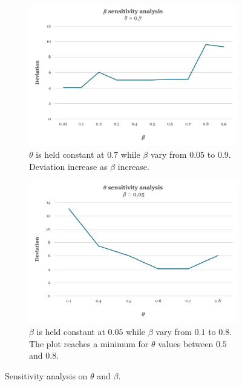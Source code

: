 \begin{figure}[h]
     \centering
     \begin{subfigure}{0.45\textwidth}
         \centering
         \includegraphics[width=\textwidth]{Images/Computational Study/comp_beta.png}
         \caption{$\theta$ is held constant at $0.7$ while $\beta$ vary from $0.05$ to $0.9$. Deviation increase as $\beta$ increase.}
     \end{subfigure} 
     \hfill
     \begin{subfigure}{0.45\textwidth}
         \centering
         \includegraphics[width=\textwidth]{Images/Computational Study/comp_theta.png}
         \caption{$\beta$ is held constant at $0.05$ while $\beta$ vary from $0.1$ to $0.8$. The plot reaches a minimum for $\theta$ values between $0.5$ and $0.8$.}
     \end{subfigure}
     \caption{Sensitivity analysis on $\theta$ and $\beta$.}
     \label{fig:assparam_tuning}
\end{figure}

